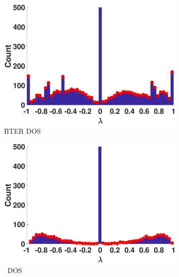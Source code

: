 \begin{figure}[ht]
  \begin{subfigure}[t]{0.47\textwidth}
    \centering  
    \captionsetup{justification=centering}
    \includegraphics[width=\textwidth,trim = .4cm 0.5cm 3.5cm 1.3cm,clip]
    {./ndos/pics/bter_dos}
    \caption{BTER DOS}
    \label{fig:bter_dos}
  \end{subfigure}
  \begin{subfigure}[t]{0.47\textwidth}
    \centering
    \captionsetup{justification=centering}
    \includegraphics[width=\textwidth,trim = .4cm 0.5cm 3.5cm 1.3cm,clip]
    {./ndos/pics/erdos}
    \caption{\Erdos\ DOS}
    \label{fig:erdos_dos2}
  \end{subfigure}
  \begin{subfigure}[t]{0.47\textwidth}
    \centering  

\end{subfigure}
\end{figure}
